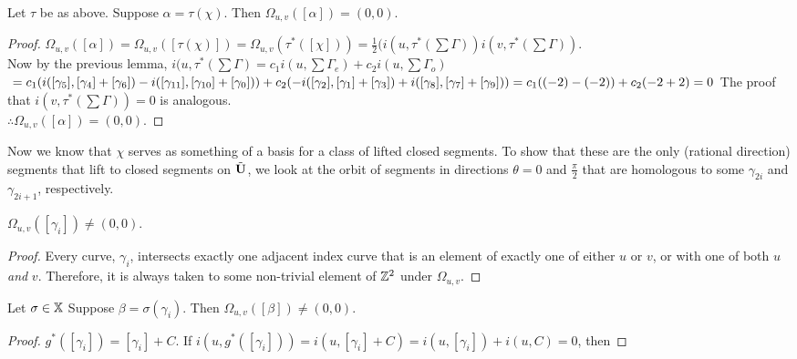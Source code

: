 \documentclass[]{article}
\begin{document}
\begin{thm}
Let $\tau$ be as above. Suppose $\alpha=\tau(\chi)$. Then $\Omega_{u,v}([\alpha])=(0,0)$. 
\begin{proof}
$\Omega_{u,v}([\alpha])=\Omega_{u,v}([\tau(\chi)])=\Omega_{u,v}(\tau^{*}([\chi]))=\frac{1}{2}(i(u,\tau^*(\sum\Gamma)) i(v,\tau^*(\sum\Gamma))$.\\
Now by the previous lemma, $i(u,\tau^*(\sum\Gamma)=c_1 i(u,\sum
\Gamma_e)+c_2 i(u,\sum\Gamma_o)$ $\\= c_1(i([\gamma_5],[\gamma_{4}]+[\gamma_6]) - i([\gamma_{11}],[\gamma_{10}]+[\gamma_{0}]))\\+c_2(-i([\gamma_2],[\gamma_{1}]+[\gamma_{3}]) + i([\gamma_8],[\gamma_{7}]+[\gamma_{9}]) )=\\c_1((-2)-(-2))+c_2(-2+ 2 )=0\\$
The proof that $i(v,\tau^*(\sum\Gamma))=0$ is analogous.\\
$\therefore \Omega_{u,v}([\alpha])=(0,0)$.
\end{proof}
\end{thm}

Now we know that $\chi$ serves as something of a basis for a class of lifted closed segments. To show that these are the only (rational direction) segments that lift to closed segments on $\tilde{\mathbf{U}}$, we look at the orbit of segments in directions $\theta=0$ and $\frac{\pi}{2}$ that are homologous to some $\gamma_{2i}$ and $\gamma_{2i+1}$, respectively.

\begin{lem}
$\Omega_{u,v}([\gamma_i])\neq (0,0)$.
\begin{proof}
Every curve, $\gamma_i$, intersects exactly one adjacent index curve that is an element of exactly one of either $u$ or $v$, or with one of both $u$ \emph{and} $v$. Therefore, it is always taken to some non-trivial element of $\mathbb{Z}^2$ under $\Omega_{u,v}$.
\end{proof}
\end{lem}

\begin{thm}
Let $\sigma\in\mathbb{X}$ Suppose $\beta=\sigma(\gamma_i)$. Then $\Omega_{u,v}([\beta])\neq (0,0)$.
\begin{proof}
$g^*([\gamma_i])=[\gamma_i]+C$.
If $i(u,g^*([\gamma_i]))=i(u,[\gamma_i]+C)=i(u,[\gamma_i])+i(u,C)=0$, then 
\end{proof}
\end{thm}
\end{document}
